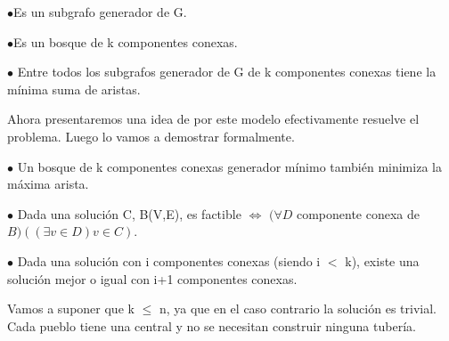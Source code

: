 $\bullet$Es un subgrafo generador de G. 

$\bullet$Es un bosque de k componentes conexas.

$\bullet$ Entre todos los subgrafos generador de G de k componentes conexas tiene la mínima suma de aristas.

Ahora presentaremos una idea de por este modelo efectivamente resuelve el problema. Luego lo vamos a demostrar formalmente. 

$\bullet$ Un bosque de k componentes conexas generador mínimo también minimiza la máxima arista.

$\bullet$ Dada una solución C, B(V,E), es factible $\Longleftrightarrow$ $(\forall D$ componente conexa de $B)((\exists v \in D) v \in C)$.  

$\bullet$ Dada una solución con i componentes conexas (siendo i $<$ k), existe una solución mejor o igual con i+1 componentes conexas.

Vamos a suponer que k $\leq$ n, ya que en el caso contrario la solución es trivial. Cada pueblo tiene una central y no se necesitan construir ninguna tubería.